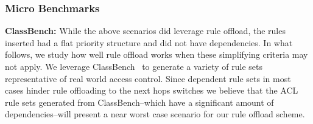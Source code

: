  



\begin{figure}[!tb]
\centering
{}
\vspace{-1em}
\label{failoverResults}
\end{figure}


\subsubsection{Micro Benchmarks}%

{\bf ClassBench:} While the above scenarios did leverage rule offload, the rules inserted had a flat priority structure and did not have dependencies. In what follows, we study how well rule offload works when these simplifying criteria may not apply.  We leverage ClassBench~\cite{classbench} to generate a variety of rule sets representative of real world access control. Since dependent rule sets in most cases hinder rule offloading to the next hops switches we believe that the ACL rule sets generated from ClassBench--which have a significant amount of dependencies--will present a near worst case scenario for our rule offload scheme.



